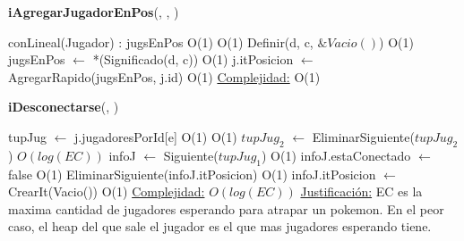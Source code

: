 \begin{algorithm}[H]{\textbf{iAgregarJugadorEnPos}(, , )} 
	\begin{algorithmic}
      \State conLineal(Jugador) : jugsEnPos \Comment O(1)
      	\Comment O(1)
          \State Definir(d, c, $\&Vacio()$) \Comment O(1)
      \EndIf
      \State jugsEnPos $\gets$ *(Significado(d, c)) \Comment O(1)
      \State j.itPosicion $\gets$ AgregarRapido(jugsEnPos, j.id) \Comment O(1)
		\Statex \underline{Complejidad:} O(1) 
    \end{algorithmic}
\end{algorithm}

\begin{algorithm}[H]{\textbf{iDesconectarse}(, )} 
	\begin{algorithmic}
		\State tupJug $\gets$ j.jugadoresPorId[e]	\Comment O(1)
			\Comment O(1)
			\State $tupJug_{2}$ $\gets$ EliminarSiguiente($tupJug_{2}$)	\Comment $O(log(EC))$
		\EndIf
    \State infoJ $\gets$ Siguiente($tupJug_{1}$) \Comment O(1) 
		\State infoJ.estaConectado $\gets$ false	\Comment O(1)
    \State EliminarSiguiente(infoJ.itPosicion) \Comment O(1)
    \State infoJ.itPosicion $\gets$ CrearIt(Vacio())	\Comment O(1)
		\medskip
		\Statex \underline{Complejidad:} $O(log(EC))$
		\Statex \underline{Justificación:} EC es la maxima cantidad de jugadores esperando para atrapar un pokemon. En el peor caso, el heap del que sale el jugador es el que mas jugadores esperando tiene.
    \end{algorithmic}
\end{algorithm}

